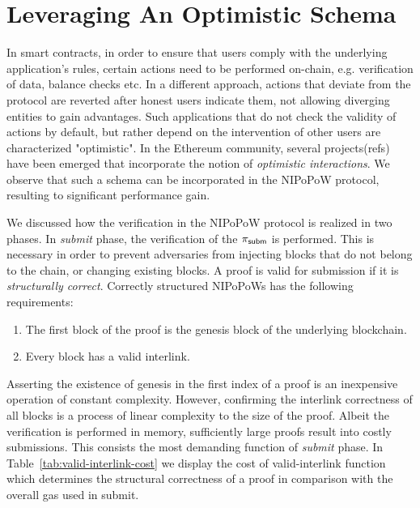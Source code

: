 \section{Leveraging An Optimistic Schema}

In smart contracts, in order to ensure that users comply with the underlying
application's rules, certain actions need to be performed on-chain, e.g.
verification of data, balance checks etc.  In a different approach, actions
that deviate from the protocol are reverted after honest users indicate them,
not allowing diverging entities to gain advantages. Such applications that do
not check the validity of actions by default, but rather depend on the
intervention of other users are characterized "optimistic".  In the Ethereum
community, several projects(refs) have been emerged that incorporate the notion
of \emph{optimistic interactions}.  We observe that such a schema can be
incorporated in the NIPoPoW protocol, resulting to significant performance
gain.

We discussed how the verification in the NIPoPoW protocol is realized in
two phases. In \emph{submit} phase, the verification of the $\mathsf{\pi_{subm}}$ is
performed.  This is necessary in order to prevent adversaries from injecting
blocks that do not belong to the chain, or changing existing blocks. A proof is
valid for submission if it is \emph{structurally correct}. Correctly structured
NIPoPoWs has the following requirements:

\begin{enumerate}
    \item The first block of the proof is the genesis block of the underlying
        blockchain.
    \item Every block has a valid interlink.
\end{enumerate}

Asserting the existence of genesis in the first index of a proof is an
inexpensive operation of constant complexity. However, confirming the interlink
correctness of all blocks is a process of linear complexity to the size of the
proof. Albeit the verification is performed in memory, sufficiently large
proofs result into costly submissions. This consists the most demanding
function of \emph{submit} phase. In Table~\ref{tab:valid-interlink-cost} we
display the cost of \textsf{valid-interlink} function which determines the
structural correctness of a proof in comparison with the overall gas used in
\textsf{submit}.



